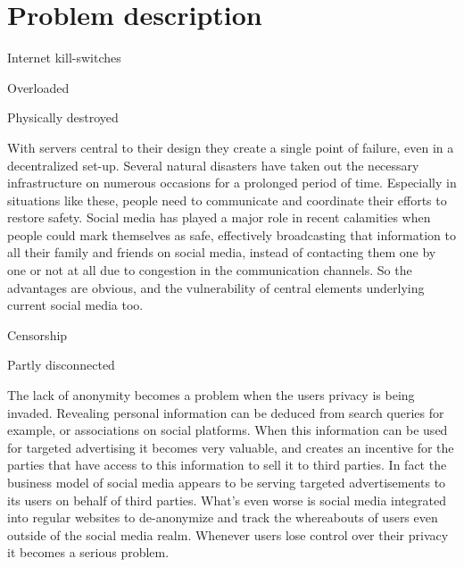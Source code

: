 \chapter{Problem description}





Internet kill-switches

Overloaded

Physically destroyed

With servers central to their design they create a single point of failure, even in a decentralized set-up.
Several natural disasters have taken out the necessary infrastructure on numerous occasions for a prolonged period of time.
Especially in situations like these, people need to communicate and coordinate their efforts to restore safety.
Social media has played a major role in recent calamities when people could mark themselves as safe, effectively broadcasting that information to all their family and friends on social media, instead of contacting them one by one or not at all due to congestion in the communication channels.
So the advantages are obvious, and the vulnerability of central elements underlying current social media too.



Censorship

Partly disconnected

The lack of anonymity becomes a problem when the users privacy is being invaded.
Revealing personal information can be deduced from search queries for example, or associations on social platforms.
When this information can be used for targeted advertising it becomes very valuable, and creates an incentive for the parties that have access to this information to sell it to third parties.
In fact the business model of social media appears to be serving targeted advertisements to its users on behalf of third parties.
What's even worse is social media integrated into regular websites to de-anonymize and track the whereabouts of users even outside of the social media realm.
Whenever users lose control over their privacy it becomes a serious problem.




